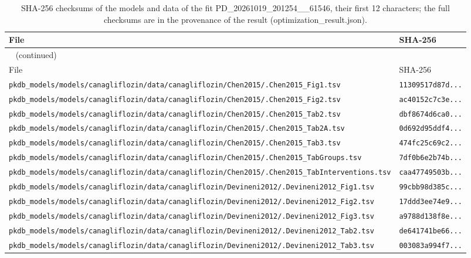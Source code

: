 \documentclass{article}
\begin{document}
\begin{longtable}{ll}
\caption{SHA-256 checksums of the models and data of the fit PD\_20261019\_201254\_\_61546, their first 12 characters; the full checksums are in the provenance of the result (optimization\_result.json).}\label{tab:checksums:PD_20261019_201254__61546} \\
\toprule
File & SHA-256 \\
\midrule
\endfirsthead
\multicolumn{2}{l}{\small\tablename~\thetable{} (continued)} \\
\toprule
File & SHA-256 \\
\midrule
\endhead
\bottomrule
\endlastfoot
\texttt{pkdb\_models/models/canagliflozin/data/canagliflozin/Chen2015/.Chen2015\_Fig1.tsv} & \texttt{11309517d87d...} \\
\texttt{pkdb\_models/models/canagliflozin/data/canagliflozin/Chen2015/.Chen2015\_Fig2.tsv} & \texttt{ac40152c7c3e...} \\
\texttt{pkdb\_models/models/canagliflozin/data/canagliflozin/Chen2015/.Chen2015\_Tab2.tsv} & \texttt{dbf8674d6ca0...} \\
\texttt{pkdb\_models/models/canagliflozin/data/canagliflozin/Chen2015/.Chen2015\_Tab2A.tsv} & \texttt{0d692d95ddf4...} \\
\texttt{pkdb\_models/models/canagliflozin/data/canagliflozin/Chen2015/.Chen2015\_Tab3.tsv} & \texttt{474fc25c69c2...} \\
\texttt{pkdb\_models/models/canagliflozin/data/canagliflozin/Chen2015/.Chen2015\_TabGroups.tsv} & \texttt{7df0b6e2b74b...} \\
\texttt{pkdb\_models/models/canagliflozin/data/canagliflozin/Chen2015/.Chen2015\_TabInterventions.tsv} & \texttt{caa47749503b...} \\
\texttt{pkdb\_models/models/canagliflozin/data/canagliflozin/Devineni2012/.Devineni2012\_Fig1.tsv} & \texttt{99cbb98d385c...} \\
\texttt{pkdb\_models/models/canagliflozin/data/canagliflozin/Devineni2012/.Devineni2012\_Fig2.tsv} & \texttt{17ddd3ee74e9...} \\
\texttt{pkdb\_models/models/canagliflozin/data/canagliflozin/Devineni2012/.Devineni2012\_Fig3.tsv} & \texttt{a9788d138f8e...} \\
\texttt{pkdb\_models/models/canagliflozin/data/canagliflozin/Devineni2012/.Devineni2012\_Tab2.tsv} & \texttt{de641741be66...} \\
\texttt{pkdb\_models/models/canagliflozin/data/canagliflozin/Devineni2012/.Devineni2012\_Tab3.tsv} & \texttt{003083a994f7...} \\

\end{longtable}
\end{document}
